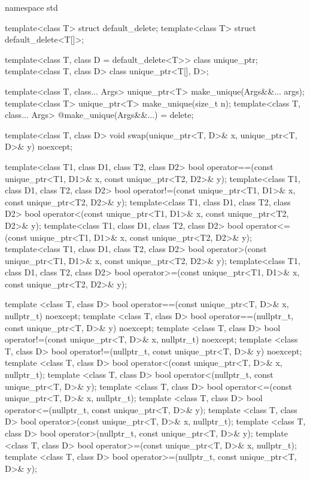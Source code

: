 \begin{codeblock}
namespace std {
  template<class T> struct default_delete;
  template<class T> struct default_delete<T[]>;

  template<class T, class D = default_delete<T>> class unique_ptr;
  template<class T, class D> class unique_ptr<T[], D>;

  template<class T, class... Args> unique_ptr<T> make_unique(Args&&... args);
  template<class T> unique_ptr<T> make_unique(size_t n);
  template<class T, class... Args> @\unspec@ make_unique(Args&&...) = delete;

  template<class T, class D> void swap(unique_ptr<T, D>& x, unique_ptr<T, D>& y) noexcept;

  template<class T1, class D1, class T2, class D2>
    bool operator==(const unique_ptr<T1, D1>& x, const unique_ptr<T2, D2>& y);
  template<class T1, class D1, class T2, class D2>
    bool operator!=(const unique_ptr<T1, D1>& x, const unique_ptr<T2, D2>& y);
  template<class T1, class D1, class T2, class D2>
    bool operator<(const unique_ptr<T1, D1>& x, const unique_ptr<T2, D2>& y);
  template<class T1, class D1, class T2, class D2>
    bool operator<=(const unique_ptr<T1, D1>& x, const unique_ptr<T2, D2>& y);
  template<class T1, class D1, class T2, class D2>
    bool operator>(const unique_ptr<T1, D1>& x, const unique_ptr<T2, D2>& y);
  template<class T1, class D1, class T2, class D2>
    bool operator>=(const unique_ptr<T1, D1>& x, const unique_ptr<T2, D2>& y);

  template <class T, class D>
    bool operator==(const unique_ptr<T, D>& x, nullptr_t) noexcept;
  template <class T, class D>
    bool operator==(nullptr_t, const unique_ptr<T, D>& y) noexcept;
  template <class T, class D>
    bool operator!=(const unique_ptr<T, D>& x, nullptr_t) noexcept;
  template <class T, class D>
    bool operator!=(nullptr_t, const unique_ptr<T, D>& y) noexcept;
  template <class T, class D>
    bool operator<(const unique_ptr<T, D>& x, nullptr_t);
  template <class T, class D>
    bool operator<(nullptr_t, const unique_ptr<T, D>& y);
  template <class T, class D>
    bool operator<=(const unique_ptr<T, D>& x, nullptr_t);
  template <class T, class D>
    bool operator<=(nullptr_t, const unique_ptr<T, D>& y);
  template <class T, class D>
    bool operator>(const unique_ptr<T, D>& x, nullptr_t);
  template <class T, class D>
    bool operator>(nullptr_t, const unique_ptr<T, D>& y);
  template <class T, class D>
    bool operator>=(const unique_ptr<T, D>& x, nullptr_t);
  template <class T, class D>
    bool operator>=(nullptr_t, const unique_ptr<T, D>& y);

}
\end{codeblock}

